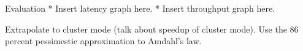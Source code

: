 \begin{block}{Evaluation}
* Insert latency graph here.
* Insert throughput graph here.

Extrapolate to cluster mode (talk about speedup of cluster mode). Use the 86
percent pessimestic approximation to Amdahl's law.

\end{block}
